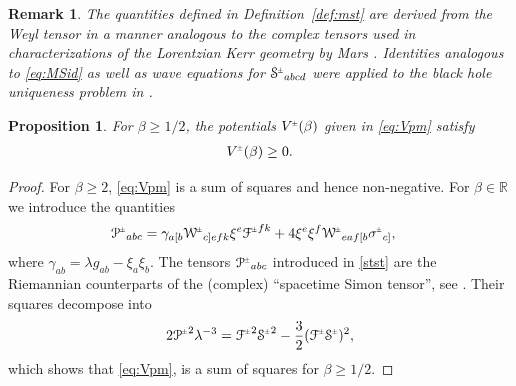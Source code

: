 \documentclass[a4paper,10pt,reqno]{amsart}
\newcommand{\Scal}{\mathop{\rm Scal}}
\theoremstyle{plain}
\newtheorem{prop}[thm]{Proposition}
\newtheorem{remark}[thm]{Remark}
\newcommand{\PM}[1]{{{#1}^{\hspace{-.5pt}\scaleto{\pm}{3.5pt}}}}
\def\Wcal{\mathcal{W}}
\def\Fcal{\mathcal{F}}
\def\Scal{\mathcal{S}}
\numberwithin{equation}{section}
\begin{document}
\begin{remark} 
The quantities defined in Definition~\ref{def:mst} are derived from the Weyl tensor in a manner analogous to the complex tensors used in characterizations of the Lorentzian Kerr geometry by Mars \cite{MR1701088}. Identities analogous to \eqref{eq:MSid} as well as wave equations for $\PM{\Scal}_{abcd}$ were applied to the black hole uniqueness problem in \cite{MR2672799, MR2461426}. 
\end{remark} 

\begin{prop}\label{prop:V(beta)} 
For $\beta \geq 1/2$, the potentials $\PM{V}(\beta)$ given in \eqref{eq:Vpm} satisfy
\begin{align}
\PM{V}(\beta) \geq 0.
\end{align}
\end{prop}
\begin{proof}
For $\beta \geq 2$, \eqref{eq:Vpm} is a sum of squares and hence non-negative. For  $\beta \in \mathbb{R}$ we introduce the
quantities 
\begin{align}
\label{stst}
\PM{\mathcal{P}}_{abc} ={}&  \gamma_{a[b}\PM{\Wcal}_{c]efk} \xi^{e} \PM{\Fcal}^{fk}  + 4 \xi^{e} \xi^{f} \PM{\Wcal}_{eaf[b}  \PM{\sigma}_{c]},
\end{align}
where $ \gamma_{ab}= \lambda g_{ab} -  \xi_{a} \xi_{b}$. 
The tensors $\PM{\mathcal{P}}_{abc}$ introduced in \eqref{stst} are  the  Riemannian counterparts of the (complex)  ``spacetime Simon tensor'', see \cite[Definition 1]{MR1701088}. 
Their squares decompose into 
\begin{align}
2 \PM{\mathcal{P}}^2 \lambda^{-3} = \PM{\Fcal}^2 \PM{\Scal}^2 -\frac{3}{2} (\PM{\Fcal}\PM{\Scal})^2, 
\end{align}
which shows that \eqref{eq:Vpm}, is a sum of squares for $\beta \geq 1/2$.
\end{proof}
\end{document}
